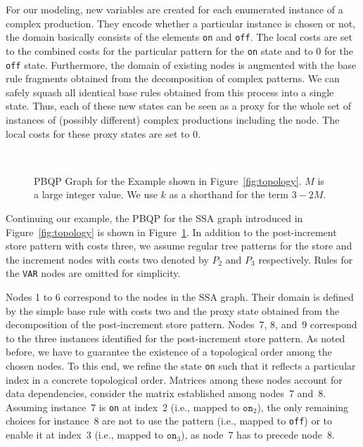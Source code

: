 For our modeling, new variables are created for each enumerated
instance of a complex production. They encode whether a particular
instance is chosen or not, \ie the domain basically consists of the
elements \texttt{on} and \texttt{off}. The local costs are set to the
combined costs for the particular pattern for the \texttt{on} state
and to 0 for the \texttt{off} state. Furthermore, the domain of
existing nodes is augmented with the base rule fragments obtained from
the decomposition of complex patterns.  We can safely squash all
identical base rules obtained from this process into a single
state. Thus, each of these new states can be seen as a proxy for the
whole set of instances of (possibly different) complex productions
including the node. The local costs for these proxy states are set to 0.

\begin{figure}
  \centering
    ~\hspace{-2cm}
  \caption{PBQP Graph for the Example shown in
    Figure~\ref{fig:topology}. $M$ is a large integer value. We use $k$ as a shorthand for the term
    $3-2M$.}\label{fig:pbqpinst}
\end{figure}

Continuing our example, the PBQP for the SSA graph introduced in
Figure~\ref{fig:topology} is shown in Figure~\ref{fig:pbqpinst}. In
addition to the post-increment store pattern with costs three, we assume
regular tree patterns for the store and the increment nodes with costs
two denoted by $P_2$ and $P_3$ respectively. Rules for the
\texttt{VAR} nodes are omitted for simplicity.

Nodes 1 to 6 correspond to the nodes in the SSA graph. Their
domain is defined by the simple base rule with costs two and the proxy
state obtained from the decomposition of the post-increment store
pattern. Nodes~7, 8, and~9 correspond to the three instances
identified for the post-increment store pattern. As noted before, we
have to guarantee the existence of a topological order among the
chosen nodes. To this end, we refine the state \texttt{on} such that it
reflects a particular index in a concrete topological order. Matrices
among these nodes account for data dependencies, \eg consider the
matrix established among nodes~7 and~8. Assuming instance~7 is
\texttt{on} at index~2 (i.e., mapped to $\texttt{on}_2$), the only remaining choices for instance~8 are
not to use the pattern (i.e., mapped to \texttt{off}) or to enable it at index~3 (i.e., mapped to $\texttt{on}_3$), as node~7 has
to precede node~8.

